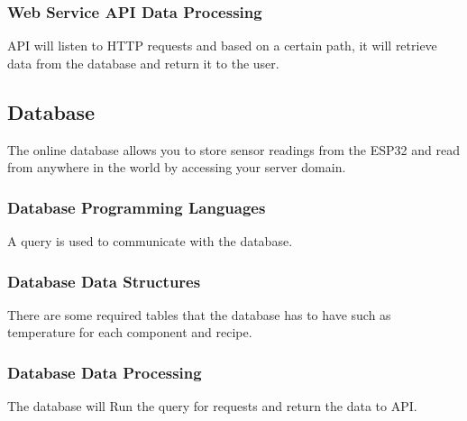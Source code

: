 \subsubsection{Web Service API Data Processing}
API will listen to HTTP requests and based on a certain path, it will retrieve data from the database and return it to the user. 


\subsection{Database}
The online database allows you to store sensor readings from the ESP32 and read from anywhere in the world by accessing your server domain.
\subsubsection{Database Programming Languages}
A query is used to communicate with the database. 

\subsubsection{Database Data Structures}
There are some required tables that the database has to have such as temperature for each component and recipe. 

\subsubsection{Database Data Processing}
The database will Run the query for requests and return the data to API.
